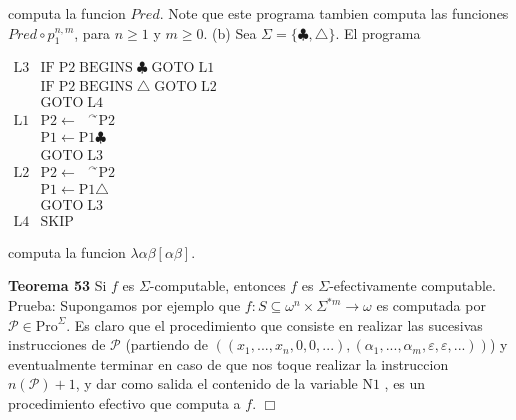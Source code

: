 computa la funcion \(Pred\). Note que este programa tambien computa las funciones \(Pred\circ p_{1}^{n,m}\), para \(n\geq 1\) y \(m\geq 0.\)
(b) Sea \(\Sigma =\{\clubsuit ,\triangle \}.\) El programa

\(\displaystyle \begin{array}{ll} \mathrm{L}3 & \mathrm{IF}\;\mathrm{P}2\;\mathrm{BEGINS}\;\clubsuit \;\mathrm{ GOTO}\;\mathrm{L}1 \\ & \mathrm{IF}\;\mathrm{P}2\;\mathrm{BEGINS}\;\triangle \;\mathrm{GOTO}\; \mathrm{L}2 \\ & \mathrm{GOTO}\;\mathrm{L}4 \\ \mathrm{L}1 & \mathrm{P}2\leftarrow \text{ }^{\curvearrowright }\mathrm{P}2 \\ & \mathrm{P}1\leftarrow \mathrm{P}1\clubsuit \\ & \mathrm{GOTO}\;\mathrm{L}3 \\ \mathrm{L}2 & \mathrm{P}2\leftarrow \text{ }^{\curvearrowright }\mathrm{P}2 \\ & \mathrm{P}1\leftarrow \mathrm{P}1\triangle \\ & \mathrm{GOTO}\;\mathrm{L}3 \\ \mathrm{L}4 & \mathrm{SKIP} \end{array} \)

computa la funcion \(\lambda \alpha \beta \left[ \alpha \beta \right] .\)



\textbf{Teorema 53} Si \(f\) es \(\Sigma \)-computable, entonces \(f\) es \(\Sigma \)-efectivamente computable.
Prueba: Supongamos por ejemplo que \(f:S\subseteq \omega ^{n}\times \Sigma ^{\ast m}\rightarrow \omega \) es computada por \(\mathcal{P}\in \mathrm{Pro}^{\Sigma }\). Es claro que el procedimiento que consiste en realizar las sucesivas instrucciones de \(\mathcal{P}\) (partiendo de \(((x_{1},...,x_{n},0,0,...),( \alpha _{1},...,\alpha _{m},\varepsilon ,\varepsilon ,...))\)) y eventualmente terminar en caso de que nos toque realizar la instruccion \(n( \mathcal{P})+1\), y dar como salida el contenido de la variable \(\mathrm{N}1\) , es un procedimiento efectivo que computa a \(f\). \(\Box\)
